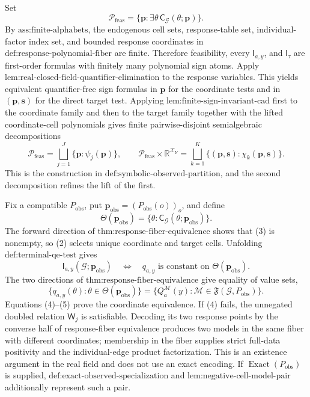 Set
\[
\mathcal P_{\mathrm{feas}}
=\{\mathbf p:\exists\theta\,\mathsf C_{\mathcal G}(\theta;\mathbf p)\}.
\tag{1}
\]
By \(\text{ass:finite-alphabets}\), the endogenous cell sets, response-table set, individual-factor index set, and bounded response coordinates in \(\text{def:response-polynomial-fiber}\) are finite.  Therefore feasibility, every \(\mathsf I_{a,y}\), and \(\mathsf I_\tau\) are first-order formulas with finitely many polynomial sign atoms.  Apply \(\text{lem:real-closed-field-quantifier-elimination}\) to the response variables.  This yields equivalent quantifier-free sign formulas in \(\mathbf p\) for the coordinate tests and in \((\mathbf p,\mathbf s)\) for the direct target test.  Applying \(\text{lem:finite-sign-invariant-cad}\) first to the coordinate family and then to the target family together with the lifted coordinate-cell polynomials gives finite pairwise-disjoint semialgebraic decompositions
\[
\mathcal P_{\mathrm{feas}}
=\bigsqcup_{j=1}^{J}\{\mathbf p:\psi_j(\mathbf p)\},
\qquad
\mathcal P_{\mathrm{feas}}\times\mathbb R^{\mathcal X_Y}
=\bigsqcup_{k=1}^{K}\{(\mathbf p,\mathbf s):\chi_k(\mathbf p,\mathbf s)\}.
\tag{2}
\]
This is the construction in \(\text{def:symbolic-observed-partition}\), and the second decomposition refines the lift of the first.

Fix a compatible \(P_{\mathrm{obs}}\), put \(\mathbf p_{\mathrm{obs}}=(P_{\mathrm{obs}}(o))_o\), and define
\[
\Theta(\mathbf p_{\mathrm{obs}})
=\{\theta:\mathsf C_{\mathcal G}(\theta;\mathbf p_{\mathrm{obs}})\}.
\tag{3}
\]
The forward direction of \(\text{thm:response-fiber-equivalence}\) shows that (3) is nonempty, so (2) selects unique coordinate and target cells.  Unfolding \(\text{def:terminal-qe-test}\) gives
\[
\mathsf I_{a,y}(\mathcal G;\mathbf p_{\mathrm{obs}})
\quad\Longleftrightarrow\quad
q_{a,y}\text{ is constant on }\Theta(\mathbf p_{\mathrm{obs}}).
\tag{4}
\]
The two directions of \(\text{thm:response-fiber-equivalence}\) give equality of value sets,
\[
\{q_{a,y}(\theta):\theta\in\Theta(\mathbf p_{\mathrm{obs}})\}
=\{Q_a^{\mathcal M}(y):\mathcal M\in\mathfrak F(\mathcal G,P_{\mathrm{obs}})\}.
\tag{5}
\]
Equations (4)--(5) prove the coordinate equivalence.  If (4) fails, the unnegated doubled relation \(\mathsf W_j\) is satisfiable.  Decoding its two response points by the converse half of response-fiber equivalence produces two models in the same fiber with different coordinates; membership in the fiber supplies strict full-data positivity and the individual-edge product factorization.  This is an existence argument in the real field and does not use an exact encoding.  If \(\operatorname{Exact}(P_{\mathrm{obs}})\) is supplied, \(\text{def:exact-observed-specialization}\) and \(\text{lem:negative-cell-model-pair}\) additionally represent such a pair.


